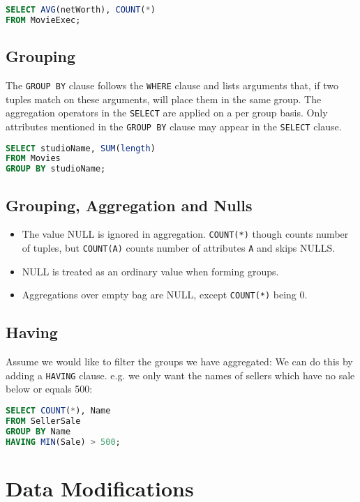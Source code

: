 \documentclass{sciposter}
\renewcommand{\t}[1]{\texttt{#1}}
\begin{document}
\begin{multicols}{3}
\begin{lstlisting}[language=SQL]
SELECT AVG(netWorth), COUNT(*) 
FROM MovieExec;
\end{lstlisting}


\subsection*{Grouping}
The \t{GROUP BY} clause follows the \t{WHERE} clause and lists arguments that, if two tuples match on these arguments, will place them in the same group. The aggregation operators in the \t{SELECT} are applied on a per group basis. Only attributes mentioned in the \t{GROUP BY} clause may appear in the \t{SELECT} clause.

\begin{lstlisting}[language=SQL]
SELECT studioName, SUM(length)
FROM Movies
GROUP BY studioName;
\end{lstlisting}

\subsection*{Grouping, Aggregation and Nulls}
\begin{itemize}
	\item The value NULL is ignored in aggregation. \t{COUNT(*)} though counts number of tuples, but \t{COUNT(A)} counts number of attributes \t{A} and skips NULLS.
	\item NULL is treated as an ordinary value when forming groups.
	\item Aggregations over empty bag are NULL, except \t{COUNT(*)} being 0.
\end{itemize}


\subsection*{Having}

Assume we would like to filter the groups we have aggregated: We can do this by adding a \t{HAVING} clause. e.g. we only want the names of sellers which have no sale below or equals 500:

\begin{lstlisting}[language=SQL]
SELECT COUNT(*), Name
FROM SellerSale
GROUP BY Name
HAVING MIN(Sale) > 500;
\end{lstlisting}


\section*{Data Modifications}


\end{multicols}
\end{document}
